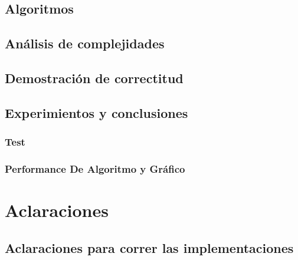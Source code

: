 \documentclass[12pt, a4paper]{article}
\begin{document}
\subsection{Algoritmos}

\subsection{An\'alisis de complejidades}

\subsection{Demostraci\'on de correctitud}
%

\subsection{Experimientos y conclusiones}
\subsubsection[2.5]{Test}

\subsubsection[2.5]{Performance De Algoritmo y Gr\'afico}
%

\newpage
\section{Aclaraciones} 
\subsection{Aclaraciones para correr las implementaciones}

\end{document}
